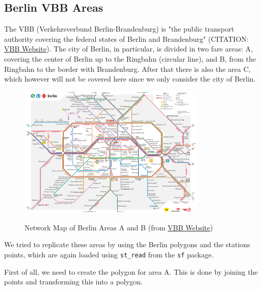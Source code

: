 \subsection{Berlin VBB Areas}

The VBB (Verkehrsverbund Berlin-Brandenburg) is "the public transport authority covering the federal states of Berlin and Brandenburg" (CITATION: \href{https://www.vbb.de/en/about-us/the-company-vbb}{VBB Website}). The city of Berlin, in particular, is divided in two fare areas: A, covering the center of Berlin up to the Ringbahn (circular line), and B, from the Ringbahn to the border with Brandenburg. After that there is also the area C, which however will not be covered here since we only consider the city of Berlin.

\begin{figure}[H]
\begin{center}
\includegraphics[width=0.8\textwidth, keepaspectratio]{S_und_U-Bahnnetz_mit_Regionalbahn_Innenstadt.pdf} \\
\caption{Network Map of Berlin Areas A and B (from \href{https://www.vbb.de/en/timetables/network-maps}{VBB Website})}
\end{center}
\end{figure}

We tried to replicate these areas by using the Berlin polygons and the stations points, which are again loaded using \texttt{st\_read} from the \texttt{sf} package.



First of all, we need to create the polygon for area A. This is done by joining the points and transforming this into a polygon.

